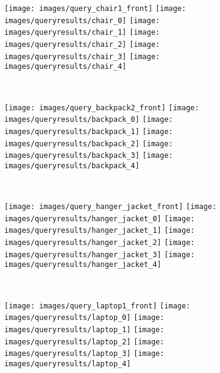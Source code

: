 \documentclass{beamer}
\begin{document}
\begin{frame}
  \begin{figure}
    \centering
    \centerline{
      \texttt{[image: images/query\_chair1\_front]}
      \texttt{[image: images/queryresults/chair\_0]}
      \texttt{[image: images/queryresults/chair\_1]}
      \texttt{[image: images/queryresults/chair\_2]}
      \texttt{[image: images/queryresults/chair\_3]}
      \texttt{[image: images/queryresults/chair\_4]}
    }\\
    \centerline{
      \texttt{[image: images/query\_backpack2\_front]}
      \texttt{[image: images/queryresults/backpack\_0]}
      \texttt{[image: images/queryresults/backpack\_1]}
      \texttt{[image: images/queryresults/backpack\_2]}
      \texttt{[image: images/queryresults/backpack\_3]}
      \texttt{[image: images/queryresults/backpack\_4]}
    }\\
    \centerline{
      \texttt{[image: images/query\_hanger\_jacket\_front]}
      \texttt{[image: images/queryresults/hanger\_jacket\_0]}
      \texttt{[image: images/queryresults/hanger\_jacket\_1]}
      \texttt{[image: images/queryresults/hanger\_jacket\_2]}
      \texttt{[image: images/queryresults/hanger\_jacket\_3]}
      \texttt{[image: images/queryresults/hanger\_jacket\_4]}
    }\\
    \centerline{
      \texttt{[image: images/query\_laptop1\_front]}
      \texttt{[image: images/queryresults/laptop\_0]}
      \texttt{[image: images/queryresults/laptop\_1]}
      \texttt{[image: images/queryresults/laptop\_2]}
      \texttt{[image: images/queryresults/laptop\_3]}
      \texttt{[image: images/queryresults/laptop\_4]}
    }
  \end{figure}
\end{frame}
\end{document}
